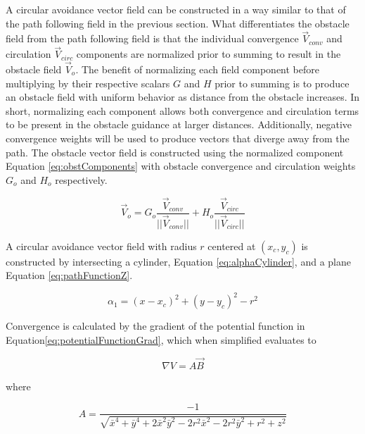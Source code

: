 \documentclass[numbered,pdftex]{ohio-etd}
\begin{document}
A circular avoidance vector field can be constructed in a way similar to that of the path following field in the previous section. What differentiates the obstacle field from the path following field is that the individual convergence $\overrightarrow{V}_{conv}$ and circulation $\overrightarrow{V}_{circ}$ components are normalized prior to summing to result in the obstacle field $\overrightarrow{V}_o$. The benefit of normalizing each field component before multiplying by their respective scalars $G$ and $H$ prior to summing is to produce an obstacle field with uniform behavior as distance from the obstacle increases. In short, normalizing each component allows both convergence and circulation terms to be present in the obstacle guidance at larger distances. Additionally, negative convergence weights will be used to produce vectors that diverge away from the path. The obstacle vector field is constructed using the normalized component Equation \ref{eq:obstComponents} with obstacle convergence and circulation weights $G_o$ and $H_o$ respectively.


\begin{equation}
\overrightarrow{V}_{o} = G_o\frac{\overrightarrow{V}_{conv}}{||\overrightarrow{V}_{conv}||}+H_o\frac{\overrightarrow{V}_{circ}}{||\overrightarrow{V}_{circ}||}
\label{eq:obstComponents}
\end{equation}



A circular avoidance vector field with radius $r$ centered at $(x_c,y_c)$ is constructed by intersecting a cylinder, Equation \ref{eq:alphaCylinder}, and a plane Equation \ref{eq:pathFunctionZ}. 

\begin{equation}\label{eq:alphaCylinder}
\alpha_1 = (x-x_c)^2 + (y-y_c)^2-r^2
\end{equation}


Convergence is calculated by the gradient of the potential function in Equation\ref{eq:potentialFunctionGrad}, which when simplified evaluates to

\begin{equation}
\nabla V = A\overrightarrow{B}
\label{eq:AB}
\end{equation}

\noindent
where


\begin{equation}
A = \dfrac{-1}{\sqrt{\bar{x}^4+\bar{y}^4+2\bar{x}^2\bar{y}^2-2r^2\bar{x}^2-2r^2\bar{y}^2+r^2+z^2}}
\end{equation}
\end{document}
